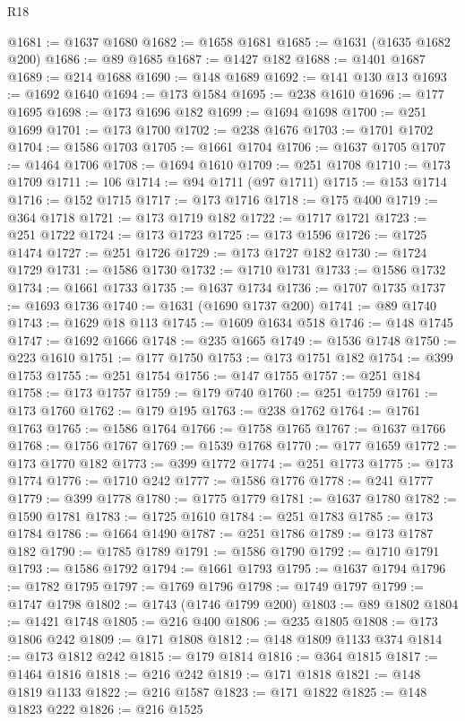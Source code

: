 \begin{lexlean}{R18}
\begin{coremodule}
@1681 := @1637 @1680
@1682 := @1658 @1681
@1685 := @1631 (@1635 @1682 @200)
@1686 := @89 @1685
@1687 := @1427 @182
@1688 := @1401 @1687
@1689 := @214 @1688
@1690 := @148 @1689
@1692 := @141 @130 @13
@1693 := @1692 @1640
@1694 := @173 @1584
@1695 := @238 @1610
@1696 := @177 @1695
@1698 := @173 @1696 @182
@1699 := @1694 @1698
@1700 := @251 @1699
@1701 := @173 @1700
@1702 := @238 @1676
@1703 := @1701 @1702
@1704 := @1586 @1703
@1705 := @1661 @1704
@1706 := @1637 @1705
@1707 := @1464 @1706
@1708 := @1694 @1610
@1709 := @251 @1708
@1710 := @173 @1709
@1711 := 106
@1714 := @94 @1711 (@97 @1711)
@1715 := @153 @1714
@1716 := @152 @1715
@1717 := @173 @1716
@1718 := @175 @400
@1719 := @364 @1718
@1721 := @173 @1719 @182
@1722 := @1717 @1721
@1723 := @251 @1722
@1724 := @173 @1723
@1725 := @173 @1596
@1726 := @1725 @1474
@1727 := @251 @1726
@1729 := @173 @1727 @182
@1730 := @1724 @1729
@1731 := @1586 @1730
@1732 := @1710 @1731
@1733 := @1586 @1732
@1734 := @1661 @1733
@1735 := @1637 @1734
@1736 := @1707 @1735
@1737 := @1693 @1736
@1740 := @1631 (@1690 @1737 @200)
@1741 := @89 @1740
@1743 := @1629 @18 @113
@1745 := @1609 @1634 @518
@1746 := @148 @1745
@1747 := @1692 @1666
@1748 := @235 @1665
@1749 := @1536 @1748
@1750 := @223 @1610
@1751 := @177 @1750
@1753 := @173 @1751 @182
@1754 := @399 @1753
@1755 := @251 @1754
@1756 := @147 @1755
@1757 := @251 @184
@1758 := @173 @1757
@1759 := @179 @740
@1760 := @251 @1759
@1761 := @173 @1760
@1762 := @179 @195
@1763 := @238 @1762
@1764 := @1761 @1763
@1765 := @1586 @1764
@1766 := @1758 @1765
@1767 := @1637 @1766
@1768 := @1756 @1767
@1769 := @1539 @1768
@1770 := @177 @1659
@1772 := @173 @1770 @182
@1773 := @399 @1772
@1774 := @251 @1773
@1775 := @173 @1774
@1776 := @1710 @242
@1777 := @1586 @1776
@1778 := @241 @1777
@1779 := @399 @1778
@1780 := @1775 @1779
@1781 := @1637 @1780
@1782 := @1590 @1781
@1783 := @1725 @1610
@1784 := @251 @1783
@1785 := @173 @1784
@1786 := @1664 @1490
@1787 := @251 @1786
@1789 := @173 @1787 @182
@1790 := @1785 @1789
@1791 := @1586 @1790
@1792 := @1710 @1791
@1793 := @1586 @1792
@1794 := @1661 @1793
@1795 := @1637 @1794
@1796 := @1782 @1795
@1797 := @1769 @1796
@1798 := @1749 @1797
@1799 := @1747 @1798
@1802 := @1743 (@1746 @1799 @200)
@1803 := @89 @1802
@1804 := @1421 @1748
@1805 := @216 @400
@1806 := @235 @1805
@1808 := @173 @1806 @242
@1809 := @171 @1808
@1812 := @148 @1809 @1133 @374
@1814 := @173 @1812 @242
@1815 := @179 @1814
@1816 := @364 @1815
@1817 := @1464 @1816
@1818 := @216 @242
@1819 := @171 @1818
@1821 := @148 @1819 @1133
@1822 := @216 @1587
@1823 := @171 @1822
@1825 := @148 @1823 @222
@1826 := @216 @1525

\end{coremodule}
\end{lexlean}
